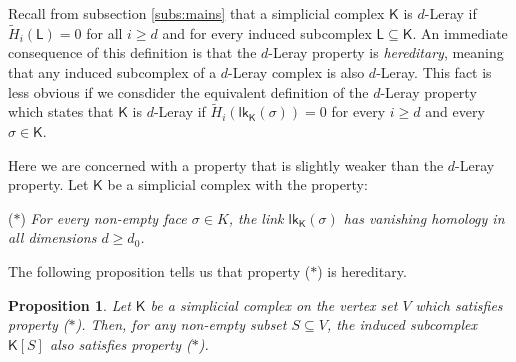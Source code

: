 \documentclass[10pt]{amsart}
\newcommand{\lk}{\mathsf{lk}}
\newtheorem{prop}[thm]{Proposition}
\theoremstyle{definition}
\begin{document}
	\smallskip
	
	Recall from subsection \ref{subs:mains} that a simplicial complex $\mathsf{K}$ is $d$-Leray if $\tilde{H}_i(\mathsf{L}) = 0$ for all $i\geq d$ and for every induced subcomplex $\mathsf{L}\subseteq \mathsf{K}$. An immediate consequence of this definition is that the $d$-Leray property is {\em hereditary}, meaning that any induced subcomplex of a $d$-Leray complex is also $d$-Leray. This fact is less obvious if we consdider the equivalent definition of the $d$-Leray property which states that $\mathsf{K}$ is $d$-Leray if $\tilde{H}_i(\mathsf{lk_K}(\sigma))=0$ for every $i\geq d$ and every $\sigma\in \mathsf{K}$. 
	
	Here we are concerned with a property that is slightly weaker than the $d$-Leray property. 
	Let $\mathsf{K}$ be a simplicial complex with the property:
	
	\medskip
	
	\begin{centerline}{
			($\ast$) {\em For every  non-empty face $\sigma\in K$, the link $\lk_\mathsf{K}(\sigma)$ 
				has vanishing homology in all dimensions $d\geq d_0$.}}
	\end{centerline}
	
	\medskip
	
	
	\noindent The following proposition tells us that property ($\ast$) is hereditary.
	
	\begin{prop} \label{hereditary}
		Let $\mathsf{K}$ be a simplicial complex on the vertex set $V$ which satisfies property {\em ($\ast$)}.
		Then, for any non-empty subset $S\subseteq V$, the induced subcomplex $\mathsf{K}[S]$ also satisfies property {\em ($\ast$)}.
	\end{prop}
	
\end{document}
